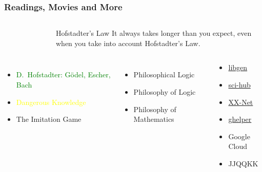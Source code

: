 \documentclass[UTF8,aspectratio=43,11pt,colorlinks,compress,openany]{beamer}%
\begin{document}
\begin{frame}\frametitle{Readings, Movies and More}
	\begin{columns}
		\begin{figure}[H]
		\end{figure}
\begin{block}{Hofstadter's Law}
It always takes longer than you expect, even when you take into account Hofstadter's Law.
\end{block}
	\end{columns}
\begin{columns}
		\column{.56\textwidth}
			\begin{itemize}
				\item \textcolor{green}{D.~Hofstadter: G\"odel, Escher, Bach}
				\item \textcolor{yellow}{Dangerous Knowledge}
				\item The Imitation Game
			\end{itemize}
			\begin{itemize}
				\item Philosophical Logic
				\item Philosophy of Logic
				\item Philosophy of Mathematics
			\end{itemize}
		\begin{block}{}
			\begin{itemize}
				\item \href{https://en.wikipedia.org/wiki/Library_Genesis}{libgen}
				\item \href{https://en.wikipedia.org/wiki/Sci-Hub}{sci-hub}
				\item \href{https://github.com/XX-net/XX-Net}{XX-Net}
				\item \href{http://googlehelper.net/}{ghelper}
				\item Google Cloud
				\item JJQQKK
			\end{itemize}
		\end{block}
\end{columns}
\end{frame}
\end{document}
